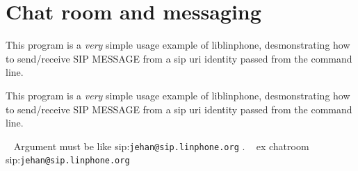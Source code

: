 \section{Chat room and messaging}
\label{group__chatroom__tuto}


This program is a {\itshape very} simple usage example of liblinphone, desmonstrating how to send/receive S\+IP M\+E\+S\+S\+A\+GE from a sip uri identity passed from the command line.  


This program is a {\itshape very} simple usage example of liblinphone, desmonstrating how to send/receive S\+IP M\+E\+S\+S\+A\+GE from a sip uri identity passed from the command line. 

~\newline
Argument must be like sip\+:{\tt jehan@sip.\+linphone.\+org} . ~\newline
 ex chatroom sip\+:{\tt jehan@sip.\+linphone.\+org} ~\newline
 
